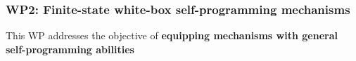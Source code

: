 


\subsubsection*{WP2: Finite-state white-box self-programming mechanisms}
This WP addresses the objective of  \textbf{equipping mechanisms with general self-programming abilities}


